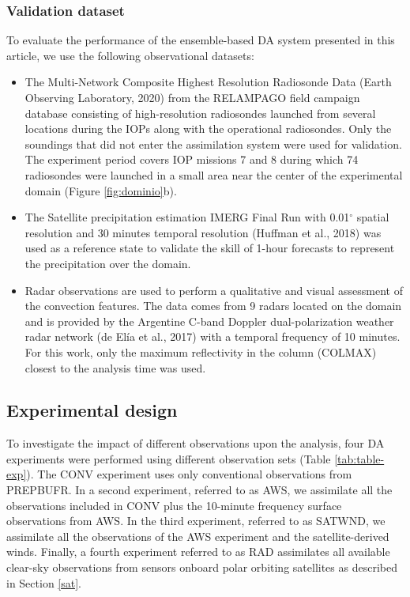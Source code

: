 \documentclass[final,5p,times,twocolumn,authoryear]{elsarticle} %
\begin{document}
\hypertarget{validation-dataset}{%
\subsubsection{Validation dataset}\label{validation-dataset}}

To evaluate the performance of the ensemble-based DA system presented in this article, we use the following observational datasets:

\begin{itemize}
\item
  The Multi-Network Composite Highest Resolution Radiosonde Data (Earth Observing Laboratory, 2020) from the RELAMPAGO field campaign database consisting of high-resolution radiosondes launched from several locations during the IOPs along with the operational radiosondes. Only the soundings that did not enter the assimilation system were used for validation. The experiment period covers IOP missions 7 and 8 during which 74 radiosondes were launched in a small area near the center of the experimental domain (Figure \ref{fig:dominio}b).
\item
  The Satellite precipitation estimation IMERG Final Run with 0.01\(^{\circ}\) spatial resolution and 30 minutes temporal resolution (Huffman et al., 2018) was used as a reference state to validate the skill of 1-hour forecasts to represent the precipitation over the domain.
\item
  Radar observations are used to perform a qualitative and visual assessment of the convection features. The data comes from 9 radars located on the domain and is provided by the Argentine C-band Doppler dual-polarization weather radar network (de Elía et al., 2017) with a temporal frequency of 10 minutes. For this work, only the maximum reflectivity in the column (COLMAX) closest to the analysis time was used.
\end{itemize}

\hypertarget{exp}{%
\subsection{Experimental design}\label{exp}}

To investigate the impact of different observations upon the analysis, four DA experiments were performed using different observation sets (Table \ref{tab:table-exp}). The CONV experiment uses only conventional observations from PREPBUFR. In a second experiment, referred to as AWS, we assimilate all the observations included in CONV plus the 10-minute frequency surface observations from AWS. In the third experiment, referred to as SATWND, we assimilate all the observations of the AWS experiment and the satellite-derived winds. Finally, a fourth experiment referred to as RAD assimilates all available clear-sky observations from sensors onboard polar orbiting satellites as described in Section \ref{sat}.
\end{document}
